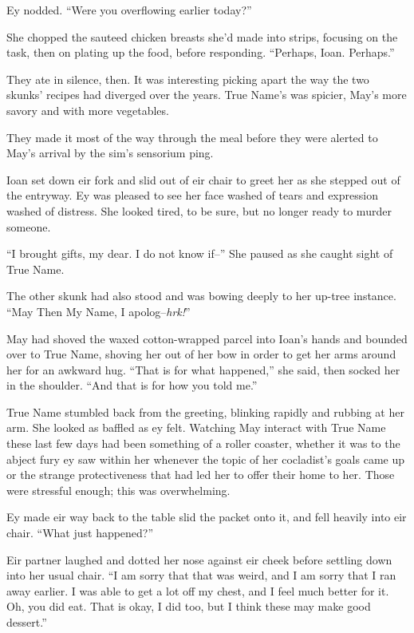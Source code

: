 Ey nodded. ``Were you overflowing earlier today?''

She chopped the sauteed chicken breasts she'd made into strips, focusing on the task, then on plating up the food, before responding. ``Perhaps, Ioan. Perhaps.''

They ate in silence, then. It was interesting picking apart the way the two skunks' recipes had diverged over the years. True Name's was spicier, May's more savory and with more vegetables.

They made it most of the way through the meal before they were alerted to May's arrival by the sim's sensorium ping.

Ioan set down eir fork and slid out of eir chair to greet her as she stepped out of the entryway. Ey was pleased to see her face washed of tears and expression washed of distress. She looked tired, to be sure, but no longer ready to murder someone.

``I brought gifts, my dear. I do not know if--'' She paused as she caught sight of True Name.

The other skunk had also stood and was bowing deeply to her up-tree instance. ``May Then My Name, I apolog--\emph{hrk!}''

May had shoved the waxed cotton-wrapped parcel into Ioan's hands and bounded over to True Name, shoving her out of her bow in order to get her arms around her for an awkward hug. ``That is for what happened,'' she said, then socked her in the shoulder. ``And that is for how you told me.''

True Name stumbled back from the greeting, blinking rapidly and rubbing at her arm. She looked as baffled as ey felt. Watching May interact with True Name these last few days had been something of a roller coaster, whether it was to the abject fury ey saw within her whenever the topic of her cocladist's goals came up or the strange protectiveness that had led her to offer their home to her. Those were stressful enough; this was overwhelming.

Ey made eir way back to the table slid the packet onto it, and fell heavily into eir chair. ``What just happened?''

Eir partner laughed and dotted her nose against eir cheek before settling down into her usual chair. ``I am sorry that that was weird, and I am sorry that I ran away earlier. I was able to get a lot off my chest, and I feel much better for it. Oh, you did eat. That is okay, I did too, but I think these may make good dessert.''

